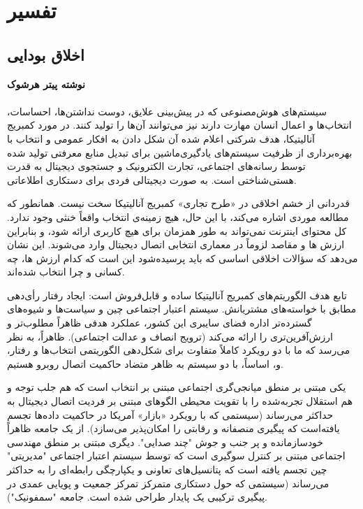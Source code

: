 {
\section*{تفسیر}
\label{sec:تفسیر}


\subsection*{اخلاق بودایی}
\label{subsec:اخلاق بودایی}
\noindent \textbf{نوشته پیتر هرشوک}
\\\\
سیستم‌های هوش‌مصنوعی که در پیش‌بینی علایق، دوست نداشتن‌ها، احساسات، انتخاب‌ها و اعمال انسان مهارت دارند نیز می‌توانند آن‌ها را تولید کنند. در مورد کمبریج آنالیتیکا، هدف شرکتی اعلام شده آن شکل دادن به افکار عمومی و انتخاب با بهره‌برداری از ظرفیت سیستم‌های یادگیری‌ماشین برای تبدیل منابع معرفتی تولید شده توسط رسانه‌های اجتماعی، تجارت الکترونیک و جستجوی دیجیتال به قدرت هستی‌شناختی است. به صورت دیجیتالی فردی برای دستکاری اطلاعاتی.
}

قدردانی از خشم اخلاقی در «طرح تجاری» کمبریج آنالیتیکا سخت نیست.
همانطور که مطالعه موردی اشاره می‌کند، با این حال، هیچ زمینه‌ی انتخاب واقعاً خنثی وجود ندارد.
کل محتوای اینترنت نمی‌تواند به طور همزمان برای هیچ کاربری ارائه شود، و بنابراین ارزش ها و مقاصد لزوماً در معماری انتخابی اتصال دیجیتال وارد می‌شوند.
این نشان می‌دهد که سؤالات اخلاقی اساسی که باید پرسیده‌شود این است که کدام ارزش ها، چه کسانی و چرا انتخاب شده‌اند.

تابع هدف الگوریتم‌های کمبریج آنالیتیکا ساده و قابل‌فروش است: ایجاد رفتار رأی‌دهی مطابق با خواسته‌های مشتریانش.
سیستم اعتبار اجتماعی چین و سیاست‌ها و شیوه‌های گسترده‌تر اداره فضای سایبری این کشور، عملکرد هدفی ظاهراً مطلوب‌تر و ارزش‌آفرین‌تری را ارائه می‌کند (ترویج انصاف و عدالت اجتماعی).
ظاهراً، به نظر می‌رسد که ما با دو رویکرد کاملاً متفاوت برای شکل‌دهی الگوریتمی انتخاب‌ها و رفتار، و، اساساً، با دو سیستم به ظاهر متضاد حاکمیت اتصال روبرو هستیم.

یکی مبتنی بر منطق میانجی‌گری اجتماعی مبتنی بر انتخاب است که هم جلب توجه و هم استقلال تجربه‌شده را با تقویت محیطی الگوهای مبتنی بر فردیت اتصال دیجیتال به حداکثر می‌رساند (سیستمی که با رویکرد «بازار» آمریکا در حاکمیت داده‌ها تجسم یافته‌است که پیگیری منصفانه و رقابتی را امکان‌پذیر می‌سازد).
از یک جامعه ظاهراً خودسازمانده و پر جنب و جوش "چند صدایی".
دیگری مبتنی بر منطق مهندسی اجتماعی مبتنی بر کنترل سوگیری است که توسط سیستم اعتبار اجتماعی "مدیریتی" چین تجسم یافته است که پتانسیل‌های تعاونی و یکپارچگی رابطه‌ای را به حداکثر می‌رساند (سیستمی که حول دستکاری متمرکز تمرکز جمعیت و پویایی عمدی در پیگیری ترکیبی یک پایدار طراحی شده است.
جامعه "سمفونیک").


